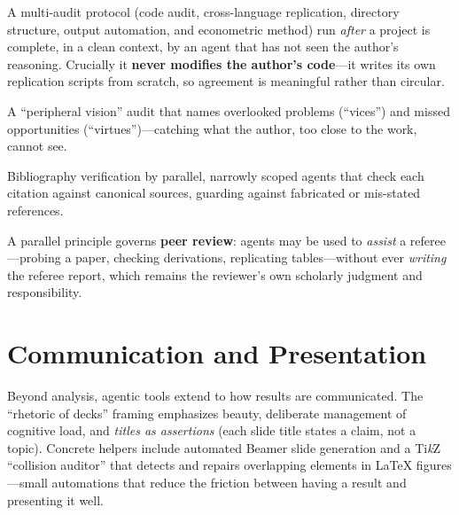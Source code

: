 \documentclass[11pt]{article}
\begin{document}
\begin{description}[leftmargin=1.2em,style=nextline]
  \item[Referee 2] A multi-audit protocol (code audit, cross-language
  replication, directory structure, output automation, and econometric
  method) run \emph{after} a project is complete, in a clean context, by an
  agent that has not seen the author's reasoning. Crucially it \textbf{never
  modifies the author's code}---it writes its own replication scripts from
  scratch, so agreement is meaningful rather than circular.
  \item[Blindspot] A ``peripheral vision'' audit that names overlooked
  problems (``vices'') and missed opportunities (``virtues'')---catching what
  the author, too close to the work, cannot see.
  \item[Bibcheck] Bibliography verification by parallel, narrowly scoped agents
  that check each citation against canonical sources, guarding against
  fabricated or mis-stated references.
\end{description}

\noindent A parallel principle governs \textbf{peer review}: agents may be used
to \emph{assist} a referee---probing a paper, checking derivations, replicating
tables---without ever \emph{writing} the referee report, which remains the
reviewer's own scholarly judgment and responsibility.

\section{Communication and Presentation}
Beyond analysis, agentic tools extend to how results are communicated. The
``rhetoric of decks'' framing emphasizes beauty, deliberate management of
cognitive load, and \emph{titles as assertions} (each slide title states a
claim, not a topic). Concrete helpers include automated Beamer slide
generation and a Ti\emph{k}Z ``collision auditor'' that detects and repairs
overlapping elements in LaTeX figures---small automations that reduce the
friction between having a result and presenting it well.

\end{document}
